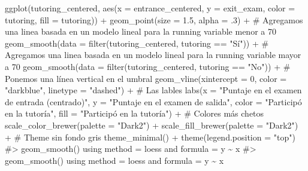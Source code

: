 \documentclass[
  letterpaper,
  DIV=11,
  numbers=noendperiod,
  oneside]{scrreprt}
\newenvironment{Shaded}{\begin{snugshade}}{\end{snugshade}}
\newcommand{\AttributeTok}[1]{\textcolor[rgb]{0.40,0.45,0.13}{#1}}
\newcommand{\CommentTok}[1]{\textcolor[rgb]{0.37,0.37,0.37}{#1}}
\newcommand{\DecValTok}[1]{\textcolor[rgb]{0.68,0.00,0.00}{#1}}
\newcommand{\FloatTok}[1]{\textcolor[rgb]{0.68,0.00,0.00}{#1}}
\newcommand{\FunctionTok}[1]{\textcolor[rgb]{0.28,0.35,0.67}{#1}}
\newcommand{\NormalTok}[1]{\textcolor[rgb]{0.00,0.23,0.31}{#1}}
\newcommand{\SpecialCharTok}[1]{\textcolor[rgb]{0.37,0.37,0.37}{#1}}
\newcommand{\StringTok}[1]{\textcolor[rgb]{0.13,0.47,0.30}{#1}}
\begin{document}
\begin{Shaded}
\begin{Highlighting}[]
\FunctionTok{ggplot}\NormalTok{(tutoring\_centered, }\FunctionTok{aes}\NormalTok{(}\AttributeTok{x =}\NormalTok{ entrance\_centered, }
                              \AttributeTok{y =}\NormalTok{ exit\_exam, }
                              \AttributeTok{color =}\NormalTok{ tutoring,}
                              \AttributeTok{fill =}\NormalTok{ tutoring)) }\SpecialCharTok{+}
  \FunctionTok{geom\_point}\NormalTok{(}\AttributeTok{size =} \FloatTok{1.5}\NormalTok{, }\AttributeTok{alpha =}\NormalTok{ .}\DecValTok{3}\NormalTok{) }\SpecialCharTok{+} 
  \CommentTok{\# Agregamos una linea basada en un modelo lineal para la running variable menor a 70}
  \FunctionTok{geom\_smooth}\NormalTok{(}\AttributeTok{data =} \FunctionTok{filter}\NormalTok{(tutoring\_centered, tutoring }\SpecialCharTok{==} \StringTok{"Sí"}\NormalTok{)) }\SpecialCharTok{+}
  \CommentTok{\# Agregamos una linea basada en un modelo lineal para la running variable mayor a 70}
  \FunctionTok{geom\_smooth}\NormalTok{(}\AttributeTok{data =} \FunctionTok{filter}\NormalTok{(tutoring\_centered, tutoring }\SpecialCharTok{==} \StringTok{"No"}\NormalTok{)) }\SpecialCharTok{+}
  \CommentTok{\# Ponemos una línea vertical en el umbral}
  \FunctionTok{geom\_vline}\NormalTok{(}\AttributeTok{xintercept =} \DecValTok{0}\NormalTok{, }\AttributeTok{color =} \StringTok{"darkblue"}\NormalTok{, }\AttributeTok{linetype =} \StringTok{"dashed"}\NormalTok{) }\SpecialCharTok{+} 
  \CommentTok{\# Las lables}
  \FunctionTok{labs}\NormalTok{(}\AttributeTok{x =} \StringTok{"Puntaje en el examen de entrada (centrado)"}\NormalTok{, }
       \AttributeTok{y =} \StringTok{"Puntaje en el examen de salida"}\NormalTok{,}
       \AttributeTok{color =} \StringTok{"Participó en la tutoría"}\NormalTok{,}
       \AttributeTok{fill =} \StringTok{"Participó en la tutoría"}\NormalTok{) }\SpecialCharTok{+} 
  \CommentTok{\# Colores más chetos}
  \FunctionTok{scale\_color\_brewer}\NormalTok{(}\AttributeTok{palette =} \StringTok{"Dark2"}\NormalTok{) }\SpecialCharTok{+}
  \FunctionTok{scale\_fill\_brewer}\NormalTok{(}\AttributeTok{palette =} \StringTok{"Dark2"}\NormalTok{) }\SpecialCharTok{+}
  \CommentTok{\# Theme sin fondo gris}
  \FunctionTok{theme\_minimal}\NormalTok{() }\SpecialCharTok{+}
  \FunctionTok{theme}\NormalTok{(}\AttributeTok{legend.position =} \StringTok{"top"}\NormalTok{)}
\CommentTok{\#\textgreater{} \textasciigrave{}geom\_smooth()\textasciigrave{} using method = \textquotesingle{}loess\textquotesingle{} and formula = \textquotesingle{}y \textasciitilde{} x\textquotesingle{}}
\CommentTok{\#\textgreater{} \textasciigrave{}geom\_smooth()\textasciigrave{} using method = \textquotesingle{}loess\textquotesingle{} and formula = \textquotesingle{}y \textasciitilde{} x\textquotesingle{}}
\end{Highlighting}
\end{Shaded}
\end{document}
